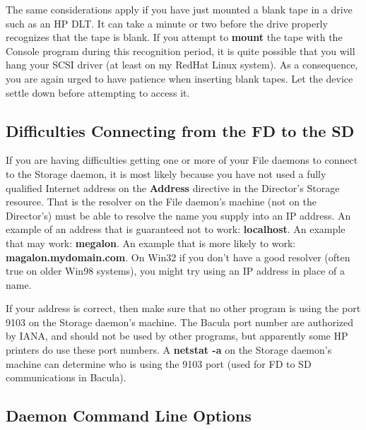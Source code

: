 {{The same considerations apply if you have just mounted a blank tape in a drive
such as an HP DLT. It can take a minute or two before the drive properly
recognizes that the tape is blank. If you attempt to {\bf mount} the tape with
the Console program during this recognition period, it is quite possible that
you will hang your SCSI driver (at least on my RedHat Linux system). As a
consequence, you are again urged to have patience when inserting blank tapes.
Let the device settle down before attempting to access it. 

\subsection*{Difficulties Connecting from the FD to the SD}

If you are having difficulties getting one or more of your File daemons to
connect to the Storage daemon, it is most likely because you have not used a
fully qualified Internet address on the {\bf Address} directive in the
Director's Storage resource. That is the resolver on the File daemon's machine
(not on the Director's) must be able to resolve the name you supply into an IP
address. An example of an address that is guaranteed not to work: {\bf
localhost}. An example that may work: {\bf megalon}. An example that is more
likely to work: {\bf magalon.mydomain.com}. On Win32 if you don't have a good
resolver (often true on older Win98 systems), you might try using an IP
address in place of a name. 

If your address is correct, then make sure that no other program is using the
port 9103 on the Storage daemon's machine. The Bacula port number are
authorized by IANA, and should not be used by other programs, but apparently
some HP printers do use these port numbers. A {\bf netstat -a} on the Storage
daemon's machine can determine who is using the 9103 port (used for FD to SD
communications in Bacula). 

\subsection*{Daemon Command Line Options}

}}
